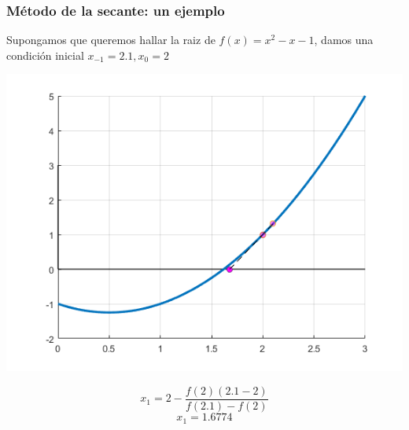 \documentclass[xcolor=svgnames]{beamer} %
\theoremstyle{plain}
\theoremstyle{definition}
\begin{document}
\begin{frame}
\frametitle{Método de la secante: un ejemplo}

Supongamos que queremos hallar la raiz de $f(x) = x^2-x-1$,
damos una condición inicial $x_{-1}=2.1,x_0=2$


\begin{minipage}{.7\linewidth}
\includegraphics[width=\linewidth]{sec_example/iter1.png} 

\end{minipage}  \begin{minipage}{.25\linewidth}

$$ x_1 = 2 - \frac{f(2)(2.1-2)}{f(2.1)-f(2)}$$
$$ x_1 = 1.6774$$
\end{minipage}

\end{frame}
\end{document}

